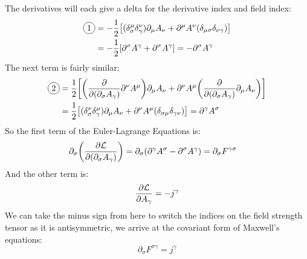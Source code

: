 \documentclass[12pt]{article}
\renewcommand{\L}{\mathcal{L}}
\newcommand{\D}{\partial}
\newcommand{\circled}[1]{\tikz[baseline=(char.base)]{
    \node[shape=circle,draw,inner sep=2pt](char){#1};}}
\begin{document}
The derivatives will each give a delta for the derivative index and field index:
\begin{align*}
  \circled{1}&=-\frac12\qty[
  (\delta^\mu_\sigma\delta^\nu_\gamma)\D_\mu A_\nu+
  \D^\mu A^\nu(\delta_{\mu\sigma}\delta_{\nu\gamma})
  ]\\
  &=-\frac12\qty[\D^\sigma A^\gamma+\D^\sigma A^\gamma]=-\D^\sigma A^\gamma
\end{align*}
The next term is fairly similar:
\begin{align*}
  \circled{2}&=\frac12\qty[
  \qty(\pdv{(\D_\sigma A_\gamma)}\D^\nu A^\mu)\D_\mu A_\nu+
  \D^\nu A^\mu\qty(\pdv{(\D_\sigma A_\gamma)}\D_\mu A_\nu)]\\
  &=\frac12\qty[
  (\delta^{\nu}_\sigma\delta^\mu_\gamma)\D_\mu A_\nu+
  \D^\nu A^\mu(\delta_{\sigma\mu}\delta_{\gamma\nu})]=\D^\gamma A^\sigma
\end{align*}
So the first term of the Euler-Lagrange Equations is:
\begin{align*}
  \D_\sigma\qty(\pdv{\L}{(\D_\sigma A_\gamma)})&=
  \D_\sigma\qty(\D^\gamma A^\sigma-\D^\sigma A^\gamma)=\D_\sigma F^{\gamma\sigma}
\end{align*}
And the other term is:
\begin{align*}
  \pdv{\L}{A_\gamma}=-j^\gamma
\end{align*}
We can take the minus sign from here to switch the indices on the field strength tensor as it is antisymmetric, we arrive at the covariant form of Maxwell's equations:
\begin{equation}
  \label{eq:p1}
  \boxed{\D_\sigma F^{\sigma\gamma}=j^\gamma}
\end{equation}
\newpage
\end{document}
